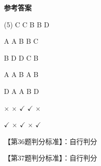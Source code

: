 \documentclass[11pt, a4paper]{article}
\begin{document}
\begin{center}
    \Huge \textbf{参考答案}
\end{center}

    \begin{tasks}[label=\arabic*. , label-width=14pt](5)
        \task C
        \task C
        \task B
        \task B
        \task D

        \task A
        \task A
        \task B
        \task B
        \task C

        \task B
        \task D
        \task D
        \task C
        \task B

        \task A
        \task A
        \task B
        \task A
        \task B

        \task D
        \task A
        \task A
        \task B
        \task D

        \task $\times$
        \task $\times$
        \task $\checkmark$
        \task $\checkmark$
        \task $\times$

        \task $\checkmark$
        \task $\times$
        \task $\checkmark$
        \task $\times$
        \task $\checkmark$
    \end{tasks}

    【第36题判分标准】：自行判分

    【第37题判分标准】：自行判分
\end{document}

